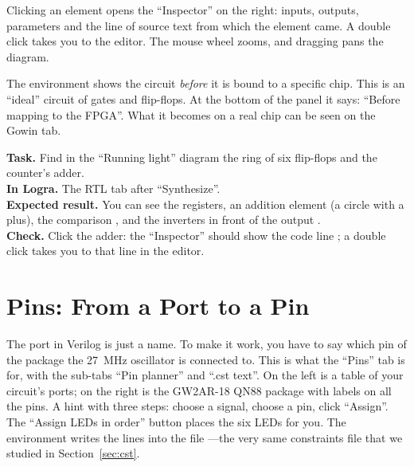 
Clicking an element opens the ``Inspector'' on the right: inputs, outputs, parameters and
the line of source text from which the element came. A double click
takes you to the editor. The mouse wheel zooms, and dragging pans the diagram.

\begin{ideabox}
The environment shows the circuit \emph{before} it is bound to a specific chip. This is an
``ideal'' circuit of gates and flip-flops. At the bottom of the panel it says: ``Before
mapping to the FPGA''. What it becomes on a real chip can be seen
on the Gowin tab.
\end{ideabox}

\begin{diybox}
\textbf{Task.} Find in the ``Running light'' diagram the ring of six flip-flops and
the counter's adder.\\
\textbf{In Logra.} The RTL tab after ``Synthesize''.\\
\textbf{Expected result.} You can see the registers, an addition element (a circle with a
plus), the comparison , and the inverters in front of the output .\\
\textbf{Check.} Click the adder: the ``Inspector'' should show the
code line ; a double click takes you to that line in the editor.
\end{diybox}

\section{Pins: From a Port to a Pin}

The port  in Verilog is just a name. To make it work, you have to say
which pin of the package the 27~MHz oscillator is connected to. This is what the
``Pins'' tab is for, with the sub-tabs ``Pin planner'' and ``.cst text''. On the left is a table of
your circuit's ports; on the right is the GW2AR-18 QN88 package with labels on all the pins. A hint
with three steps: choose a signal, choose a pin, click ``Assign''.
The ``Assign LEDs in order'' button places the six LEDs for you. The environment
writes the  lines into the file ---the very same constraints
file that we studied in Section~\ref{sec:cst}.


